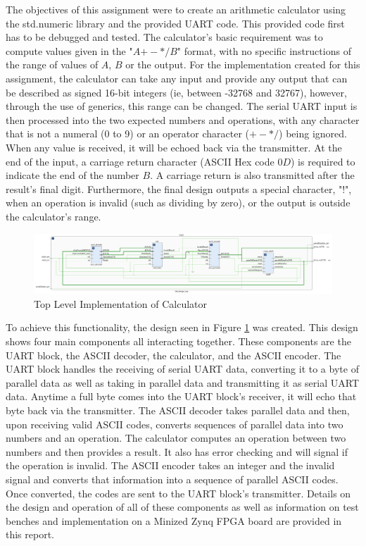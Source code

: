 \documentclass[11pt]{article}
\begin{document}
The objectives of this assignment were to create an arithmetic calculator using the std.numeric library and the provided UART code.
This provided code first has to be debugged and tested.
The calculator's basic requirement was to compute values given in the "$A {+-*/} B$" format, with no specific instructions of the range of values of $A$, $B$ or the output.
For the implementation created for this assignment, the calculator can take any input and provide any output that can be described as signed 16-bit integers (ie, between -32768 and 32767),
however, through the use of generics, this range can be changed.
The serial UART input is then processed into the two expected numbers and operations, with any character that is not a numeral (0 to 9) or an operator character ($+-*/$) being ignored.
When any value is received, it will be echoed back via the transmitter.
At the end of the input, a carriage return character (ASCII Hex code $0D$) is required to indicate the end of the number $B$.
A carriage return is also transmitted after the result's final digit.
Furthermore, the final design outputs a special character, "!", when an operation is invalid (such as dividing by zero), or the output is outside the calculator's range.

\begin{figure}[H]        
    \centering
    \includegraphics[width=\textwidth]{TopLevelImp.png}
    \caption{Top Level Implementation of Calculator}
    \label{fig:toplevel}
\end{figure} 

To achieve this functionality, the design seen in Figure \ref{fig:toplevel} was created.
This design shows four main components all interacting together.
These components are the UART block, the ASCII decoder, the calculator, and the ASCII encoder.
The UART block handles the receiving of serial UART data, converting it to a byte of parallel data as well as taking in parallel data and transmitting it as serial UART data.
Anytime a full byte comes into the UART block's receiver, it will echo that byte back via the transmitter.
The ASCII decoder takes parallel data and then, upon receiving valid ASCII codes, converts sequences of parallel data into two numbers and an operation.
The calculator computes an operation between two numbers and then provides a result.
It also has error checking and will signal if the operation is invalid.
The ASCII encoder takes an integer and the invalid signal and converts that information into a sequence of parallel ASCII codes.
Once converted, the codes are sent to the UART block's transmitter.
Details on the design and operation of all of these components as well as information on test benches and implementation on a Minized Zynq FPGA board are provided in this report.
\end{document}
